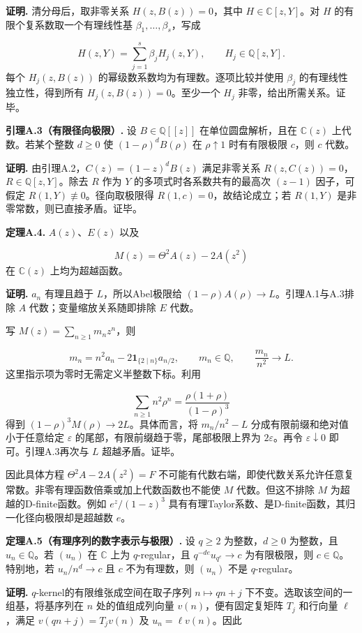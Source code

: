 \documentclass[UTF8,11pt,fontset=fandol]{ctexart}
\begin{document}
\textbf{证明.} 清分母后，取非零关系 $H(z,B(z))=0$，其中 $H\in\mathbb C[z,Y]$。对 $H$ 的有限个复系数取一个有理线性基 $\beta_1,\ldots,\beta_s$，写成

\[
H(z,Y)=\sum_{j=1}^s\beta_jH_j(z,Y),\qquad H_j\in\mathbb Q[z,Y].
\]
每个 $H_j(z,B(z))$ 的幂级数系数均为有理数。逐项比较并使用 $\beta_j$ 的有理线性独立性，得到所有 $H_j(z,B(z))=0$。至少一个 $H_j$ 非零，给出所需关系。证毕。

\textbf{引理A.3（有限径向极限）.} 设 $B\in\mathbb Q[[z]]$ 在单位圆盘解析，且在 $\mathbb C(z)$ 上代数。若某个整数 $d\ge0$ 使 $(1-\rho)^dB(\rho)$ 在 $\rho\uparrow1$ 时有有限极限 $c$，则 $c$ 代数。

\textbf{证明.} 由引理A.2，$C(z)=(1-z)^dB(z)$ 满足非零关系 $R(z,C(z))=0$，$R\in\mathbb Q[z,Y]$。除去 $R$ 作为 $Y$ 的多项式时各系数共有的最高次 $(z-1)$ 因子，可假定 $R(1,Y)\not\equiv0$。径向取极限得 $R(1,c)=0$，故结论成立；若 $R(1,Y)$ 是非零常数，则已直接矛盾。证毕。

\textbf{定理A.4.} $A(z)$、$E(z)$ 以及

\[
M(z)=\Theta^2A(z)-2A(z^2)
\]
在 $\mathbb C(z)$ 上均为超越函数。

\textbf{证明.} $a_n$ 有理且趋于 $L$，所以Abel极限给 $(1-\rho)A(\rho)\to L$。引理A.1与A.3排除 $A$ 代数；变量缩放关系随即排除 $E$ 代数。

写 $M(z)=\sum_{n\ge1}m_nz^n$，则

\[
m_n=n^2a_n-2\mathbf1_{\{2\mid n\}}a_{n/2},\qquad m_n\in\mathbb Q,\qquad \frac{m_n}{n^2}\longrightarrow L.
\]
这里指示项为零时无需定义半整数下标。利用

\[
\sum_{n\ge1}n^2\rho^n=\frac{\rho(1+\rho)}{(1-\rho)^3}
\]
得到 $(1-\rho)^3M(\rho)\to2L$。具体而言，将 $m_n/n^2-L$ 分成有限前缀和绝对值小于任意给定 $\varepsilon$ 的尾部，有限前缀趋于零，尾部极限上界为 $2\varepsilon$。再令 $\varepsilon\downarrow0$ 即可。引理A.3再次与 $L$ 超越矛盾。证毕。

因此具体方程 $\Theta^2A-2A(z^2)=F$ 不可能有代数右端，即使代数关系允许任意复常数。非零有理函数倍乘或加上代数函数也不能使 $M$ 代数。但这不排除 $M$ 为超越的D-finite函数。例如 $e^z/(1-z)^3$ 具有有理Taylor系数、是D-finite函数，其归一化径向极限却是超越数 $e$。

\textbf{定理A.5（有理序列的数字表示与极限）.} 设 $q\ge2$ 为整数，$d\ge0$ 为整数，且 $u_n\in\mathbb Q$。若 $(u_n)$ 在 $\mathbb C$ 上为 $q$-regular，且 $q^{-de}u_{q^e}\to c$ 为有限极限，则 $c\in\mathbb Q$。特别地，若 $u_n/n^d\to c$ 且 $c$ 不为有理数，则 $(u_n)$ 不是 $q$-regular。

\textbf{证明.} $q$-kernel的有限维张成空间在取子序列 $n\mapsto qn+j$ 下不变。选取该空间的一组基，将基序列在 $n$ 处的值组成列向量 $v(n)$，便有固定复矩阵 $T_j$ 和行向量 $\ell$，满足 $v(qn+j)=T_jv(n)$ 及 $u_n=\ell v(n)$。因此
\end{document}
